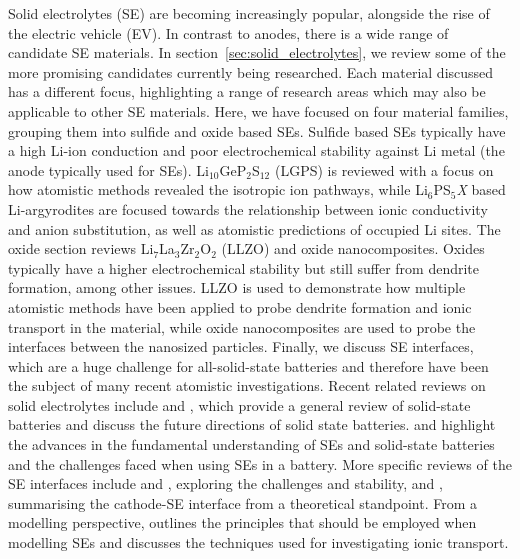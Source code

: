 \documentclass[../main.tex]{subfiles}
\begin{document}
Solid electrolytes (SE) are becoming increasingly popular, alongside the rise of the electric vehicle (EV).\cite{Woods_2021} In contrast to anodes, there is a wide range of candidate SE materials. In section~\ref{sec:solid_electrolytes}, we review some of the more promising candidates currently being researched. Each material discussed has a different focus, highlighting a range of research areas which may also be applicable to other SE materials. Here, we have focused on four material families, grouping them into sulfide and oxide based SEs. Sulfide based SEs typically have a high Li-ion conduction and poor electrochemical stability against Li metal (the anode typically used for SEs). \cite{Zhu2015, Zhang2019se_rev} Li$_{10}$GeP$_2$S$_{12}$ (LGPS) is reviewed with a focus on how atomistic methods revealed the isotropic ion pathways, while Li$_6$PS$_5$\textit{X} based Li-argyrodites are focused towards the relationship between ionic conductivity and anion substitution, as well as atomistic predictions of occupied Li sites. The oxide section reviews Li$_7$La$_3$Zr$_2$O$_2$ (LLZO) and oxide nanocomposites. Oxides typically have a higher electrochemical stability but still suffer from dendrite formation, among other issues.\cite{Zhu2015} LLZO is used to demonstrate how multiple atomistic methods have been applied to probe dendrite formation and ionic transport in the material, while oxide nanocomposites are used to probe the interfaces between the nanosized particles. Finally, we discuss SE interfaces, which are a huge challenge for all-solid-state batteries and therefore have been the subject of many recent atomistic investigations. Recent related reviews on solid electrolytes include \citeauthor{Sun2017se_review} \cite{Sun2017se_review} and \citeauthor{Zhang2018se_review}, \cite{Zhang2018se_review} which provide a general review of solid-state batteries and discuss the future directions of solid state batteries. \citeauthor{famprikis_fundamentals_2019} \cite{famprikis_fundamentals_2019} and \citeauthor{Gurung2019} \cite{Gurung2019} highlight the advances in the fundamental understanding of SEs and solid-state batteries and the challenges faced when using SEs in a battery. More specific reviews of the SE interfaces include \citeauthor{Xu2018exp} \cite{Xu2018exp} and \citeauthor{Xiao2020interfacerev} \cite{Xiao2020interfacerev}, exploring the challenges and stability, and \citeauthor{Tateyama2019} \cite{Tateyama2019}, summarising the cathode-SE interface from a theoretical standpoint. From a modelling perspective, \citeauthor{Ceder2018} \cite{Ceder2018} outlines the principles that should be employed when modelling SEs and \citeauthor{Gao2020_ion_transport} \cite{Gao2020_ion_transport} discusses the techniques used for investigating ionic transport.
\end{document}
